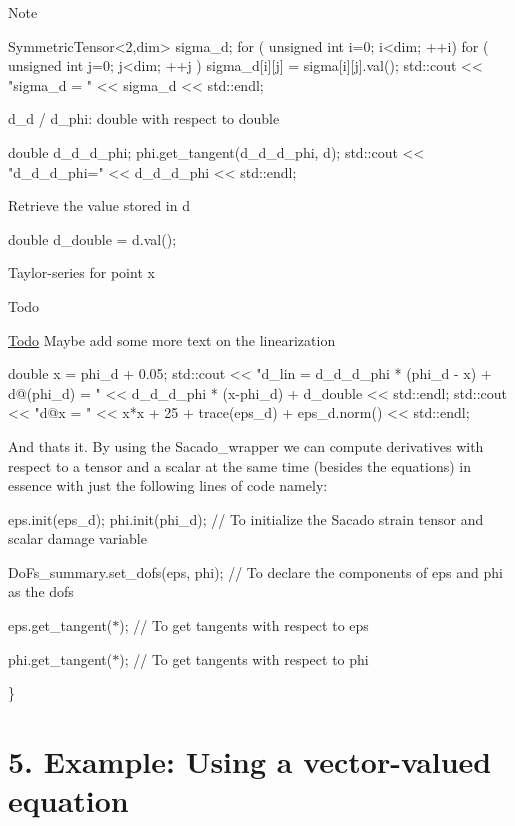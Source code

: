 \begin{DoxyNote}{Note}
\begin{DoxyCode}
SymmetricTensor<2,dim> sigma\_d;
\textcolor{keywordflow}{for} ( \textcolor{keywordtype}{unsigned} \textcolor{keywordtype}{int} i=0; i<dim; ++i)
      \textcolor{keywordflow}{for} ( \textcolor{keywordtype}{unsigned} \textcolor{keywordtype}{int} j=0; j<dim; ++j )
          sigma\_d[i][j] = sigma[i][j].val();
std::cout << \textcolor{stringliteral}{"sigma\_d = "} << sigma\_d << std::endl;
\end{DoxyCode}
 d\+\_\+d / d\+\_\+phi\+: double with respect to double 
\begin{DoxyCode}
\textcolor{keywordtype}{double} d\_d\_d\_phi;
phi.get\_tangent(d\_d\_d\_phi, d);
std::cout << \textcolor{stringliteral}{"d\_d\_d\_phi="} << d\_d\_d\_phi << std::endl;
\end{DoxyCode}
 Retrieve the value stored in d 
\begin{DoxyCode}
\textcolor{keywordtype}{double} d\_double = d.val();
\end{DoxyCode}
 Taylor-\/series for point x 
\end{DoxyNote}
\begin{DoxyRefDesc}{Todo}
\item[\hyperlink{todo__todo000009}{Todo}]Maybe add some more text on the linearization \end{DoxyRefDesc}

\begin{DoxyCode}
\textcolor{keywordtype}{double} x = phi\_d + 0.05;
std::cout << \textcolor{stringliteral}{"d\_lin = d\_d\_d\_phi * (phi\_d - x) + d@(phi\_d) = "} << d\_d\_d\_phi * (x-phi\_d) + d\_double << 
      std::endl;
std::cout << \textcolor{stringliteral}{"d@x = "} << x*x + 25 + trace(eps\_d) + eps\_d.norm() << std::endl;
\end{DoxyCode}
 And that\textquotesingle{}s it. By using the Sacado\+\_\+wrapper we can compute derivatives with respect to a tensor and a scalar at the same time (besides the equations) in essence with just the following lines of code namely\+:
\begin{DoxyItemize}
\item eps.\+init(eps\+\_\+d); phi.\+init(phi\+\_\+d); // To initialize the Sacado strain tensor and scalar damage variable
\item Do\+Fs\+\_\+summary.\+set\+\_\+dofs(eps, phi); // To declare the components of eps and phi as the dofs
\item eps.\+get\+\_\+tangent($\ast$); // To get tangents with respect to eps
\item phi.\+get\+\_\+tangent($\ast$); // To get tangents with respect to phi 
\begin{DoxyCode}
\}
\end{DoxyCode}
 
\end{DoxyItemize}\hypertarget{index_Ex5}{}\section{5. Example\+: Using a vector-\/valued equation}\label{index_Ex5}

